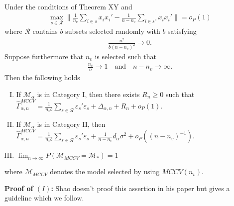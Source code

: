 \documentclass[Research_Module_ES.tex]{subfiles}
\begin{document}
\begin{satz}
Under the conditions of Theorem XY and
\begin{align*}
\max_{s\in \mathcal{R}}\biggl\lVert \frac{1}{n_v}\sum_{i\in s}x_ix_i' - \frac{1}{n-n_v}\sum_{i\in s^c}x_ix_i'\biggr\rVert =o_P(1)
\end{align*}
where $\mathcal{R}$ contains $b$ subsets selected randomly with $b$ satisfying
\begin{align*}
\frac{n^2}{b(n-n_v)^2}\to 0.
\end{align*}
Suppose furthermore that $n_v$ is selected such that
\begin{align*}
\frac{n_v}{n}\to 1 \quad \textrm{and} \quad n-n_v \to \infty.
\end{align*}
Then the following holds
\begin{enumerate}[(I)]
\item If $\mathcal{M}_\alpha$ is in Category I, then there exists $R_n \ge 0$ such that $\hat{\Gamma}_{\alpha,n}^{MCCV} = \frac{1}{n_vb}\sum_{s\in \mathcal{R}}\varepsilon_s'\varepsilon_s + \Delta_{\alpha,n} + R_n + o_P(1)$.
\item If $\mathcal{M}_\alpha$ is in Category II, then $\hat{\Gamma}_{\alpha,n}^{MCCV} = \frac{1}{n_vb}\sum_{s\in \mathcal{R}}\varepsilon_s'\varepsilon_s + \frac{1}{n-n_v}d_\alpha\sigma^2  + o_P((n-n_v)^{-1})$.
\item $\lim_{n\to\infty}P(\mathcal{M}_{MCCV}=\mathcal{M}_\ast) = 1$
\end{enumerate}
where $\mathcal{M}_{MCCV}$ denotes the model selected by using $MCCV(n_v)$.
\end{satz}

\textbf{Proof of $(I)$:} 
Shao doesn't proof this assertion in his paper but gives a guideline which we follow.
\end{document}
